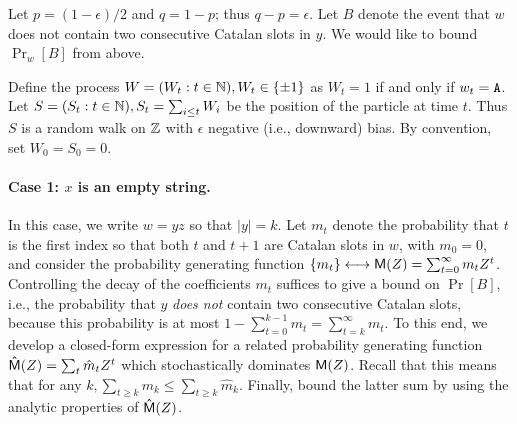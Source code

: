   Let $p = (1 - \epsilon)/2$ and $q = 1 - p$; 
  thus $q - p = \epsilon$. 
  Let $B$ denote the event that 
  $w$ does not contain two consecutive Catalan slots in $y$. 
  We would like to bound $\Pr_w[B]$ from above.

  Define the process $W = (W_t : t \in \mathbb{N}), W_t \in \{\pm 1\}$ as $W_t = 1$ if and only if $w_t = \mathtt{A}$. 
  Let $S = (S_t : t \in \mathbb{N}), S_t = \sum_{i \leq t} W_i$ be the position of the particle at time $t$. 
  Thus $S$ is a random walk on $\mathbb{Z}$ with $\epsilon$ negative (i.e., downward) bias. 
  By convention, set $W_0 = S_0 = 0$. 

  \paragraph{Case 1: $x$ is an empty string.} 
  In this case, we write $w = yz$ so that $|y| = k$. 
  Let $m_t$ denote the probability that 
  $t$ is the first index so that both $t$ and $t+1$ are Catalan slots in $w$, 
  with $m_0 = 0$, and consider the probability generating function 
  $\{m_t\} \longleftrightarrow \mathsf{M}(Z) = \sum_{t = 0}^\infty m_t Z^t$. 
  Controlling the decay of the coefficients $m_t$ suffices
  to give a bound on $\Pr[B]$, i.e., 
  the probability that 
  $y$ \emph{does not} contain two consecutive Catalan slots, 
  because this probability is at most 
  $
    1 - \sum_{t =0}^{k-1} m_t 
      = \sum_{t = k}^\infty m_t
  $. 
  To this end, we develop a
  closed-form expression for a related probability generating function
  $\mathsf{\hat{M}}(Z) = \sum_t \hat{m}_t Z^t$ which stochastically
  dominates $\mathsf{M}(Z)$. 
  Recall that this means that for any $k, \sum_{t \geq k} m_k \leq \sum_{t \geq k} \hat{m}_k$. 
  Finally, bound the latter sum  
  by using the analytic properties of $\mathsf{\hat{M}}(Z)$. 


